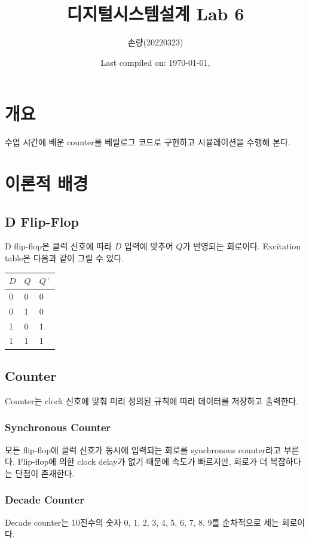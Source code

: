 \documentclass{scrartcl}
\title{디지털시스템설계 Lab 6}
\author{손량(20220323)}
\date{Last compiled on: \today, \currenttime}
\begin{document}
\maketitle

\section{개요}
수업 시간에 배운 counter를 베릴로그 코드로 구현하고 시뮬레이션을 수행해 본다.

\section{이론적 배경}
\subsection{D Flip-Flop}
D flip-flop은 클럭 신호에 따라 \(D\) 입력에 맞추어 \(Q\)가 반영되는 회로이다.
Excitation table은 다음과 같이 그릴 수 있다.
\begin{table}[H]
  \centering
  \begin{tabular}{ll|l}
    \hline
    \(D\) & \(Q\) & \(Q^+\) \\
    \hline
    0 & 0 & 0 \\
    0 & 1 & 0 \\
    1 & 0 & 1 \\
    1 & 1 & 1 \\
    \hline
  \end{tabular}
\end{table}

\subsection{Counter}
Counter는 clock 신호에 맞춰 미리 정의된 규칙에 따라 데이터를 저장하고 출력한다.

\subsubsection{Synchronous Counter}
모든 flip-flop에 클럭 신호가 동시에 입력되는 회로를 synchronous counter라고 부른다.
Flip-flop에 의한 clock delay가 없기 때문에 속도가 빠르지만, 회로가 더 복잡하다는 단점이 존재한다.

\subsubsection{Decade Counter}
Decade counter는 10진수의 숫자 0, 1, 2, 3, 4, 5, 6, 7, 8, 9를 순차적으로 세는 회로이다.
\end{document}

